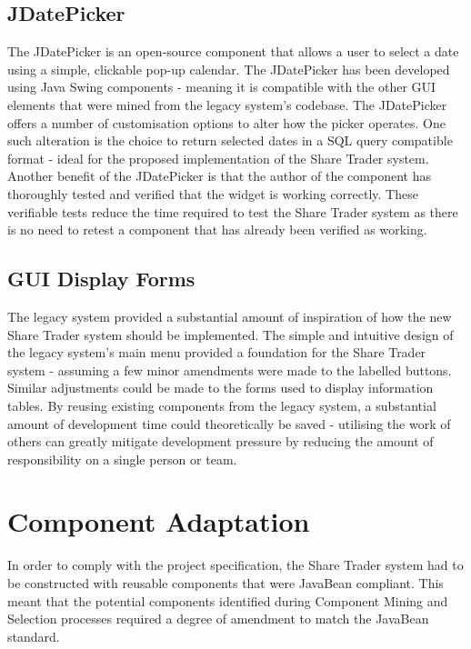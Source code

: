 \documentclass[12pt, a4paper,titlepage]{article}
\begin{document}
\subsection{JDatePicker}
The JDatePicker is an open-source component that allows a user to select a
date using a simple, clickable pop-up calendar.
The JDatePicker has been developed using Java Swing components - meaning it is
compatible with the other GUI elements that were mined from the legacy system's
codebase.
The JDatePicker offers a number of customisation options to alter how the
picker operates.
One such alteration is the choice to return selected dates in a SQL query
compatible format - ideal for the proposed implementation of the Share Trader
system.  
Another benefit of the JDatePicker is that the author of the component has
thoroughly tested and verified that the widget is working correctly. 
These verifiable tests reduce the time required to test the Share Trader system
as there is no need to retest a component that has already been verified as
working.

\subsection{GUI Display Forms}
The legacy system provided a substantial amount of inspiration of how the new
Share Trader system should be implemented. 
The simple and intuitive design of the legacy system’s main menu provided a
foundation for the Share Trader system - assuming a few minor amendments were
made to the labelled buttons.
Similar adjustments could be made to the forms used to display information
tables.  
By reusing existing components from the legacy system, a substantial
amount of development time could theoretically be saved - utilising the work
of others can greatly mitigate development pressure by reducing the amount of
responsibility on a single person or team.


\section{Component Adaptation}
In order to comply with the project specification, the  Share Trader system
had to be constructed with reusable components that were JavaBean compliant.
This meant that the potential components identified during Component Mining
and Selection
processes  required a degree of amendment to match the JavaBean standard. 
\end{document}
